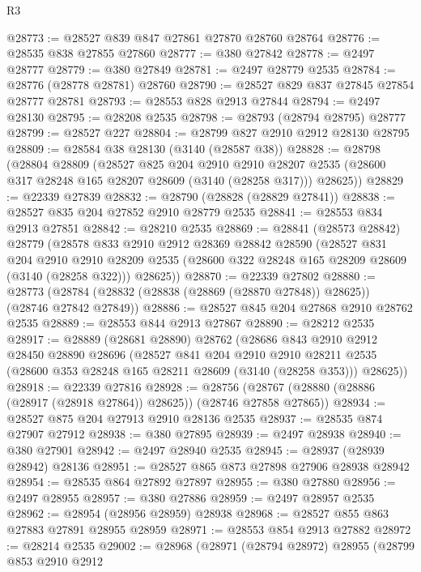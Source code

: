 \begin{lexlean}{R3}
\begin{coremodule}
@28773 := @28527 @839 @847 @27861 @27870 @28760 @28764
@28776 := @28535 @838 @27855 @27860
@28777 := @380 @27842
@28778 := @2497 @28777
@28779 := @380 @27849
@28781 := @2497 @28779 @2535
@28784 := @28776 (@28778 @28781) @28760
@28790 := @28527 @829 @837 @27845 @27854 @28777 @28781
@28793 := @28553 @828 @2913 @27844
@28794 := @2497 @28130
@28795 := @28208 @2535
@28798 := @28793 (@28794 @28795) @28777
@28799 := @28527 @227
@28804 := @28799 @827 @2910 @2912 @28130 @28795
@28809 := @28584 @38 @28130 (@3140 (@28587 @38))
@28828 := @28798
    (@28804
      @28809
      (@28527
        @825
        @204
        @2910
        @2910
        @28207
        @2535
        (@28600 @317 @28248 @165 @28207 @28609 (@3140 (@28258 @317)))
        @28625))
@28829 := @22339 @27839
@28832 := @28790 (@28828 (@28829 @27841))
@28838 := @28527 @835 @204 @27852 @2910 @28779 @2535
@28841 := @28553 @834 @2913 @27851
@28842 := @28210 @2535
@28869 := @28841
    (@28573 @28842)
    @28779
    (@28578
      @833
      @2910
      @2912
      @28369
      @28842
      @28590
      (@28527
        @831
        @204
        @2910
        @2910
        @28209
        @2535
        (@28600 @322 @28248 @165 @28209 @28609 (@3140 (@28258 @322)))
        @28625))
@28870 := @22339 @27802
@28880 := @28773 (@28784 (@28832 (@28838 (@28869 (@28870 @27848)) @28625)) (@28746 @27842 @27849))
@28886 := @28527 @845 @204 @27868 @2910 @28762 @2535
@28889 := @28553 @844 @2913 @27867
@28890 := @28212 @2535
@28917 := @28889
    (@28681 @28890)
    @28762
    (@28686
      @843
      @2910
      @2912
      @28450
      @28890
      @28696
      (@28527
        @841
        @204
        @2910
        @2910
        @28211
        @2535
        (@28600 @353 @28248 @165 @28211 @28609 (@3140 (@28258 @353)))
        @28625))
@28918 := @22339 @27816
@28928 := @28756 (@28767 (@28880 (@28886 (@28917 (@28918 @27864)) @28625)) (@28746 @27858 @27865))
@28934 := @28527 @875 @204 @27913 @2910 @28136 @2535
@28937 := @28535 @874 @27907 @27912
@28938 := @380 @27895
@28939 := @2497 @28938
@28940 := @380 @27901
@28942 := @2497 @28940 @2535
@28945 := @28937 (@28939 @28942) @28136
@28951 := @28527 @865 @873 @27898 @27906 @28938 @28942
@28954 := @28535 @864 @27892 @27897
@28955 := @380 @27880
@28956 := @2497 @28955
@28957 := @380 @27886
@28959 := @2497 @28957 @2535
@28962 := @28954 (@28956 @28959) @28938
@28968 := @28527 @855 @863 @27883 @27891 @28955 @28959
@28971 := @28553 @854 @2913 @27882
@28972 := @28214 @2535
@29002 := @28968
    (@28971
      (@28794 @28972)
      @28955
      (@28799
        @853
        @2910
        @2912

\end{coremodule}
\end{lexlean}
